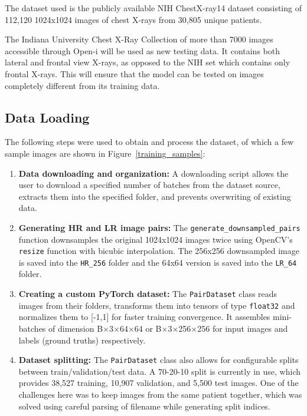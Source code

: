 \documentclass{article} %
\begin{document}
The dataset used is the publicly available NIH ChestX-ray14 dataset \citep{wang17} consisting of 112,120 1024x1024 images of chest X-rays from 30,805 unique patients.

The Indiana University Chest X-Ray Collection of more than 7000 images accessible through Open-i \citep{demner2016} will be used as new testing data. It contains both lateral and frontal view X-rays, as opposed to the NIH set which contains only frontal X-rays. This will ensure that the model can be tested on images completely different from its training data.

\subsection{Data Loading}

The following steps were used to obtain and process the dataset, of which a few sample images are shown in Figure~\ref{training_samples}:

\begin{enumerate}
    \item \textbf{Data downloading and organization:} A downloading script allows the user to download a specified number of batches from the dataset source, extracts them into the specified folder, and prevents overwriting of existing data.
    
    \item \textbf{Generating HR and LR image pairs:} The \texttt{generate\_downsampled\_pairs} function downsamples the original 1024x1024 images twice using OpenCV’s \texttt{resize} function with bicubic interpolation. The 256x256 downsampled image is saved into the \texttt{HR\_256} folder and the 64x64 version is saved into the \texttt{LR\_64} folder.
    
    \item \textbf{Creating a custom PyTorch dataset:} The \texttt{PairDataset} class reads images from their folders, transforms them into tensors of type \texttt{float32} and normalizes them to [-1,1] for faster training convergence. It assembles mini-batches of dimension B$\times$3$\times$64$\times$64 or B$\times$3$\times$256$\times$256 for input images and labels (ground truths) respectively.
    
    \item \textbf{Dataset splitting:} The \texttt{PairDataset} class also allows for configurable splits between train/validation/test data. A 70-20-10 split is currently in use, which provides 38,527 training, 10,907 validation, and 5,500 test images. One of the challenges here was to keep images from the same patient together, which was solved using careful parsing of filename while generating split indices.
\end{enumerate}
\end{document}
